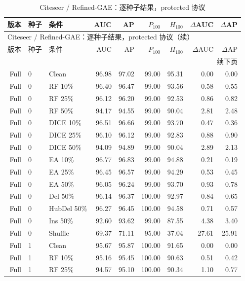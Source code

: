 {\footnotesize
\setlength{\tabcolsep}{3.2pt}
\renewcommand{\arraystretch}{1.10}
\begin{longtable}{rllrrrrrr}
\caption{Citeseer / Refined-GAE：逐种子结果，protected 协议}\\
\toprule
版本 & 种子 & 条件 & AUC & AP & $P_{100}$ & $H_{100}$ & $\Delta$AUC & $\Delta$AP \\
\midrule
\endfirsthead
\multicolumn{9}{l}{Citeseer / Refined-GAE：逐种子结果，protected 协议（续）}\\
\toprule
版本 & 种子 & 条件 & AUC & AP & $P_{100}$ & $H_{100}$ & $\Delta$AUC & $\Delta$AP \\
\midrule
\endhead
\midrule\multicolumn{9}{r}{续下页}\\
\endfoot
\bottomrule
\endlastfoot
Full & 0 & Clean & 96.98 & 97.02 & 99.00 & 95.31 & 0.00 & 0.00 \\
Full & 0 & RF 10\% & 96.40 & 96.47 & 99.00 & 93.56 & 0.58 & 0.55 \\
Full & 0 & RF 25\% & 96.12 & 96.20 & 99.00 & 92.53 & 0.86 & 0.82 \\
Full & 0 & RF 50\% & 94.17 & 94.55 & 99.00 & 90.04 & 2.81 & 2.48 \\
Full & 0 & DICE 10\% & 96.51 & 96.66 & 99.00 & 93.70 & 0.47 & 0.36 \\
Full & 0 & DICE 25\% & 96.10 & 96.12 & 99.00 & 92.83 & 0.88 & 0.90 \\
Full & 0 & DICE 50\% & 94.09 & 94.89 & 99.00 & 90.04 & 2.89 & 2.13 \\
Full & 0 & EA 10\% & 96.77 & 96.83 & 99.00 & 94.88 & 0.21 & 0.19 \\
Full & 0 & EA 25\% & 96.45 & 96.57 & 99.00 & 94.29 & 0.53 & 0.45 \\
Full & 0 & EA 50\% & 96.05 & 96.24 & 99.00 & 93.70 & 0.93 & 0.78 \\
Full & 0 & Del 50\% & 96.14 & 96.37 & 100.00 & 92.97 & 0.84 & 0.65 \\
Full & 0 & HubDel 50\% & 96.27 & 96.45 & 100.00 & 94.58 & 0.71 & 0.57 \\
Full & 0 & Ins 50\% & 92.60 & 93.62 & 99.00 & 87.55 & 4.38 & 3.40 \\
Full & 0 & Shuffle & 69.37 & 71.11 & 95.00 & 37.04 & 27.61 & 25.91 \\
Full & 1 & Clean & 95.67 & 95.87 & 100.00 & 91.65 & 0.00 & 0.00 \\
Full & 1 & RF 10\% & 95.16 & 95.45 & 100.00 & 90.63 & 0.51 & 0.42 \\
Full & 1 & RF 25\% & 94.57 & 95.10 & 100.00 & 90.34 & 1.10 & 0.77 \\

\end{longtable}}
